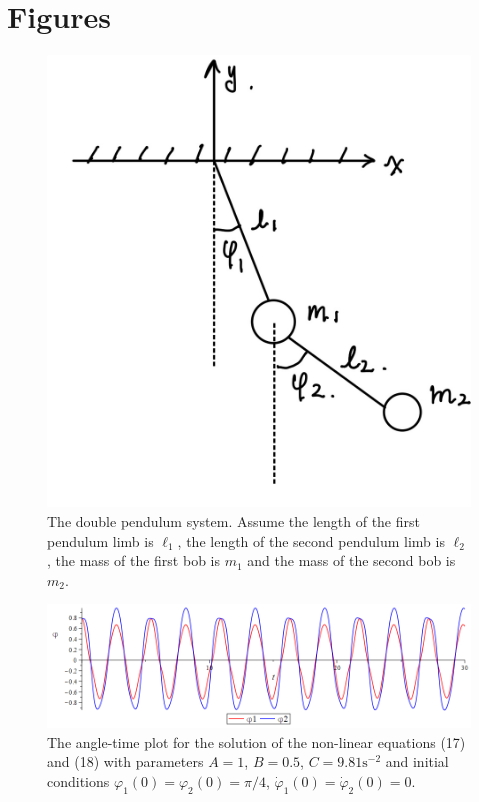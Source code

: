 \documentclass[11pt]{article}
\begin{document}
\section{Figures}
\begin{figure}[H]
    \centering
    \includegraphics[scale=0.2]{Figure1.PNG}
    \caption{The double pendulum system. Assume the length of the first pendulum limb is \(\ell_1\), the length of the second pendulum limb
    is \(\ell_2\), the mass of the first bob is \(m_1\) and the mass of the second bob is \(m_2\).}
    \label{Figure 1}
\end{figure}
\begin{figure}[ht]
    \centering
    \includegraphics[scale=0.45]{Figure2.PNG}
    \caption{The angle-time plot for the solution of the non-linear equations (17) and (18) with parameters \(A = 1\), \(B= 0.5\), \(C = 9.81 \mathrm{s}^{-2}\) and initial conditions \(\varphi_1(0) = \varphi_2(0) = \pi/4\), \(\dot{\varphi}_1(0) = \dot{\varphi}_2(0) = 0\).}
    \label{Figure 2}
\end{figure}
\end{document}

